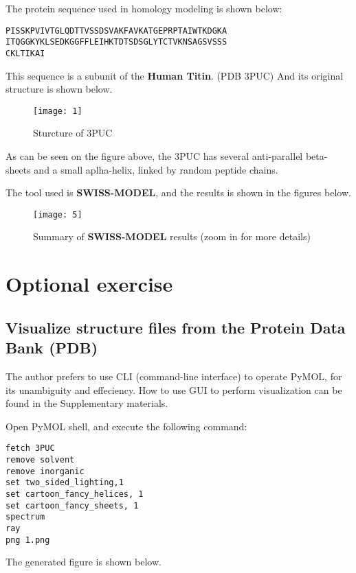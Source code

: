 \documentclass[en,black,12pt,normal]{elegantnote}
\begin{document}
The protein sequence used in homology modeling is shown below:

\begin{lstlisting}
PISSKPVIVTGLQDTTVSSDSVAKFAVKATGEPRPTAIWTKDGKA
ITQGGKYKLSEDKGGFFLEIHKTDTSDSGLYTCTVKNSAGSVSSS
CKLTIKAI
\end{lstlisting}

This sequence is a subunit of the \textbf{Human Titin}. (PDB 3PUC) And its original structure is shown below.


\begin{figure}[H]
    \centering
    \texttt{[image: 1]}
    \caption{Sturcture of 3PUC}
    \label{3PUCG}
\end{figure}

As can be seen on the figure above, the 3PUC has several anti-parallel beta-sheets and a small aplha-helix, linked by random peptide chains.


The tool used is \textbf{SWISS-MODEL}, and the results is shown in the figures below.

\begin{figure}[H]
    \centering
    \texttt{[image: 5]}
    \caption{Summary of \textbf{SWISS-MODEL} results (zoom in for more details)}
    \label{SMRES}
\end{figure}

\section{Optional exercise}


\subsection{Visualize structure files from the Protein Data Bank (PDB)}

The author prefers to use CLI (command-line interface) to operate PyMOL, for its unambiguity and effeciency.
How to use GUI to perform visualization can be found in the Supplementary materials.

Open PyMOL shell, and execute the following command:

\begin{lstlisting}
fetch 3PUC
remove solvent
remove inorganic
set two_sided_lighting,1
set cartoon_fancy_helices, 1
set cartoon_fancy_sheets, 1
spectrum
ray 
png 1.png
\end{lstlisting}

The generated figure is shown below.
\end{document}
